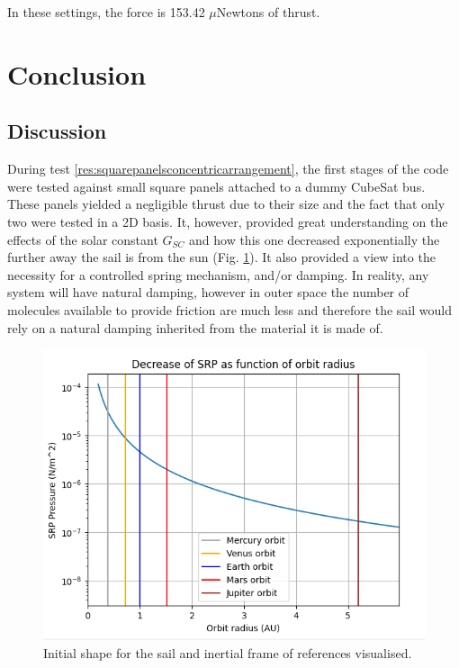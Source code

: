 In these settings, the force is 153.42 $\mu$Newtons of thrust.


\section{Conclusion}
\subsection{Discussion}

During test \ref{res:squarepanelsconcentricarrangement}, the first stages of the code were tested against small square panels attached to a dummy CubeSat bus. These panels yielded a negligible thrust due to their size and the fact that only two were tested in a 2D basis. It, however, provided great understanding on the effects of the solar constant $G_{SC}$ and how this one decreased exponentially the further away the sail is from the sun (Fig. \ref{gscplot}). It also provided a view into the necessity for a controlled spring mechanism, and/or damping. In reality, any system will have natural damping, however in outer space the number of molecules available to provide friction are much less and therefore the sail would rely on a natural damping inherited from the material it is made of.

\begin{figure}[H]
\centering
  \includegraphics[width=0.75\linewidth]{images/pressuredecay.png}
\caption{Initial shape for the sail and inertial frame of references visualised.}
\label{gscplot}
\end{figure}

